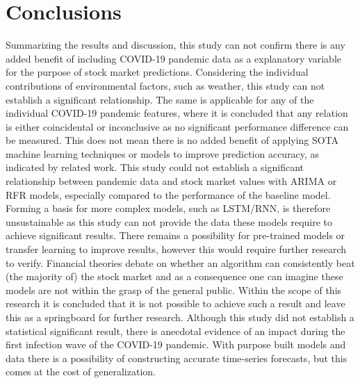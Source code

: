 \section{Conclusions}
\label{sec:conc}
Summarizing the results and discussion, this study can not confirm there is any added benefit of including COVID-19 pandemic data as a explanatory variable for the purpose of stock market predictions. Considering the individual contributions of environmental factors, such as weather, this study can not establish a significant relationship. The same is applicable for any of the individual COVID-19 pandemic features, where it is concluded that any relation is either coincidental or inconclusive as no significant performance difference can be measured.
This does not mean there is no added benefit of applying SOTA machine learning techniques or models to improve prediction accuracy, as indicated by related work. This study could not establish a significant relationship between pandemic data and stock market values with ARIMA or RFR models, especially compared to the performance of the baseline model. Forming a basis for more complex models, such as LSTM/RNN, is therefore unsustainable as this study can not provide the data these models require to achieve significant results. There remains a possibility for pre-trained models or transfer learning to improve results, however this would require further research to verify. Financial theories debate on whether an algorithm can consistently beat (the majority of) the stock market and as a consequence one can imagine these models are not within the grasp of the general public. Within the scope of this research it is concluded that it is not possible to achieve such a result and leave this as a springboard for further research.
Although this study did not establish a statistical significant result, there is anecdotal evidence of an impact during the first infection wave of the COVID-19 pandemic. With purpose built models and data there is a possibility of constructing accurate time-series forecasts, but this comes at the cost of generalization.

